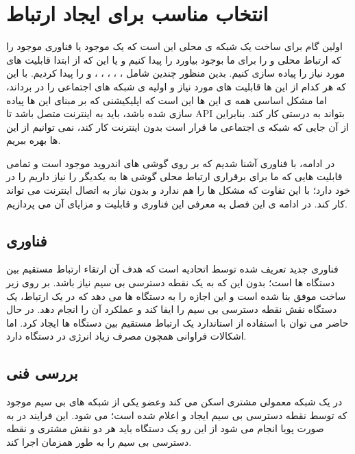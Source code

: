 \chapter{انتخاب مناسب برای ایجاد ارتباط }
\thispagestyle{empty}

اولین گام برای ساخت یک شبکه ی محلی این است که یک 
موجود یا فناوری موجود را که ارتباط محلی و 
را برای ما بوجود بیاورد را پیدا کنیم و یا این که از ابتدا قابلیت های مورد نیاز را پیاده سازی کنیم. بدین منظور چندین 
شامل
،
،
،
،
،
و
را پیدا کردیم.
با این که هر کدام از این 
ها قابلیت های مورد نیاز و اولیه ی شبکه های اجتماعی را در برداند، اما مشکل اساسی همه ی این 
ها این است که اپلیکیشنی که بر مبنای این ها پیاده سازی شده باشد، باید به اینترنت متصل باشد تا API بتواند به درستی کار کند. بنابراین از آن جایی که شبکه ی اجتماعی ما قرار است بدون اینترنت کار کند، نمی توانیم از این 
ها بهره ببریم.

در ادامه، با فناوری
 آشنا شدیم که بر روی گوشی های اندروید موجود است و تمامی قابلیت هایی که ما برای برقراری ارتباط محلی گوشی ها به یکدیگر را نیاز داریم را در خود دارد؛ با این تفاوت که مشکل 
ها را هم ندارد و بدون نیاز به اتصال اینترنت می تواند کار کند. در ادامه ی این فصل به معرفی این فناوری و قابلیت و مزایای آن می پردازیم.

\section{فناوری } 
 فناوری جدید تعریف شده توسط اتحادیه 
  است که هدف آن ارتقاء ارتباط مستقیم بین دستگاه ها است؛ بدون این که به یک نقطه دسترسی بی سیم
   نیاز باشد.
بر روی زیر ساخت موفق 
بنا شده است و این اجازه را به دستگاه ها می دهد که در یک ارتباط، یک دستگاه نقش  نقطه دسترسی بی سیم را ایفا کند و عملکرد آن را انجام دهد. در حال حاضر می توان با استفاده از استاندارد 
یک ارتباط مستقیم بین دستگاه ها ایجاد کرد. اما اشکالات فراوانی همچون مصرف زیاد انرژی در دستگاه دارد.
 
\section{بررسی فنی}
 در یک شبکه معمولی 
مشتری
 اسکن می کند وعضو یکی  از شبکه های بی سیم موجود که توسط نقطه دسترسی بی سیم ایجاد و اعلام شده است؛ می شود. این فرایند در 
به صورت پویا
انجام می شود از این رو یک دستگاه 
باید هر دو نقش مشتری و نقطه دسترسی بی سیم را به طور همزمان اجرا کند.

